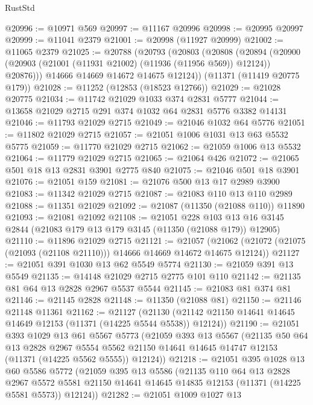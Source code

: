 \begin{lexlean}{RustStd}
\begin{coremodule}
@20996 := @10971 @569
@20997 := @11167 @20996
@20998 := @20995 @20997
@20999 := @11041 @2379
@21001 := @20998 (@11927 @20999)
@21002 := @11065 @2379
@21025 := @20788
    (@20793
      (@20803
        (@20808
          (@20894 (@20900 (@20903 (@21001 (@11931 @21002) (@11936 (@11956 @569)) @12124)) @20876)))
        @14666
        @14669
        @14672
        @14675
        @12124))
    (@11371 (@11419 @20775 @179))
@21028 := @11252 (@12853 (@18523 @12766))
@21029 := @21028 @20775
@21034 := @11742 @21029 @1033 @374 @2831 @5777
@21044 := @13658 @21029 @2715 @291 @374 @1032 @64 @2831 @5776 @3382 @14131
@21046 := @11793 @21029 @2715
@21049 := @21046 @1032 @64 @5776
@21051 := @11802 @21029 @2715
@21057 := @21051 @1006 @1031 @13 @63 @5532 @5775
@21059 := @11770 @21029 @2715
@21062 := @21059 @1006 @13 @5532
@21064 := @11779 @21029 @2715
@21065 := @21064 @426
@21072 := @21065 @501 @18 @13 @2831 @3901 @2775 @840
@21075 := @21046 @501 @18 @3901
@21076 := @21051 @159
@21081 := @21076 @500 @13 @17 @2989 @3900
@21083 := @11342 @21029 @2715
@21087 := @21083 @110 @13 @110 @2989
@21088 := @11351 @21029
@21092 := @21087 (@11350 (@21088 @110)) @11890
@21093 := @21081 @21092
@21108 := @21051
    @228
    @103
    @13
    @16
    @3145
    @2844
    (@21083 @179 @13 @179 @3145 (@11350 (@21088 @179)) @12905)
@21110 := @11896 @21029 @2715
@21121 := @21057
    (@21062 (@21072 (@21075 (@21093 (@21108 @21110))) @14666 @14669 @14672 @14675 @12124))
@21127 := @21051 @391 @1030 @13 @62 @5549 @5774
@21130 := @21059 @391 @13 @5549
@21135 := @14148 @21029 @2715 @2775 @101 @110
@21142 := @21135 @81 @64 @13 @2828 @2967 @5537 @5544
@21145 := @21083 @81 @374 @81
@21146 := @21145 @2828
@21148 := @11350 (@21088 @81)
@21150 := @21146 @21148 @11361
@21162 := @21127
    (@21130 (@21142 @21150 @14641 @14645 @14649 @12153 (@11371 (@14225 @5544 @5538)) @12124))
@21190 := @21051
    @393
    @1029
    @13
    @61
    @5567
    @5773
    (@21059
      @393
      @13
      @5567
      (@21135
        @50
        @64
        @13
        @2828
        @2967
        @5554
        @5562
        @21150
        @14641
        @14645
        @14747
        @12153
        (@11371 (@14225 @5562 @5555))
        @12124))
@21218 := @21051
    @395
    @1028
    @13
    @60
    @5586
    @5772
    (@21059
      @395
      @13
      @5586
      (@21135
        @110
        @64
        @13
        @2828
        @2967
        @5572
        @5581
        @21150
        @14641
        @14645
        @14835
        @12153
        (@11371 (@14225 @5581 @5573))
        @12124))
@21282 := @21051
    @1009
    @1027
    @13

\end{coremodule}
\end{lexlean}
